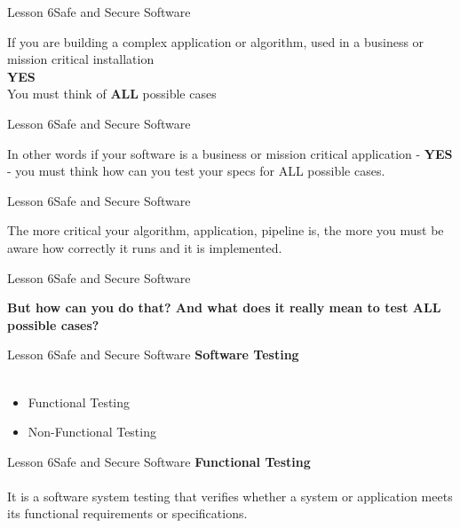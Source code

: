 \documentclass[aspectratio=1610]{beamer}
\begin{document}
\begin{frame}{Lesson 6}{Safe and Secure Software}
\Huge
\begin{center}
If you are building a complex application or algorithm, 
used in a business or mission critical installation\\
\textbf{YES}\\
You must think of \textbf{ALL} possible cases
\end{center}
\end{frame}



\begin{frame}{Lesson 6}{Safe and Secure Software}
\Huge
\begin{center}
In other words if your software is a business or mission 
critical application - \textbf{YES} - you must think how can you test
your specs for ALL possible cases.
\end{center}
\end{frame}



\begin{frame}{Lesson 6}{Safe and Secure Software}
\Huge
\begin{center}
The more critical your algorithm, application, pipeline is, the more you must be aware 
how correctly it runs and it is implemented.
\end{center}
\end{frame}



\begin{frame}{Lesson 6}{Safe and Secure Software}
\Huge
\begin{center}
\textbf{But how can you do that? And what does it really mean to test ALL possible 
cases?}
\end{center}
\end{frame}



\begin{frame}{Lesson 6}{Safe and Secure Software}
\LARGE
\textbf{Software Testing}\\~\\ 
\begin{itemize}
    \item Functional Testing
    \item Non-Functional Testing
\end{itemize}
\end{frame}



\begin{frame}{Lesson 6}{Safe and Secure Software}
\LARGE
\textbf{Functional Testing}\\~\\ 
It is a software system testing that verifies whether a system or application meets its 
\alert{functional requirements or specifications}. 
\end{frame}
\end{document}
